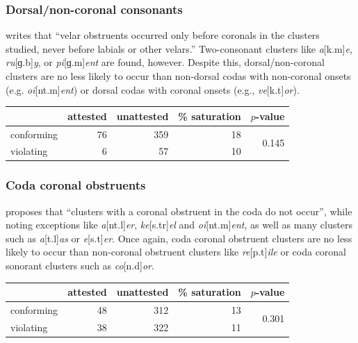 \subsubsection{Dorsal/non-coronal consonants}

\citet[173]{Pierrehumbert1994} writes that ``velar obstruents occurred only before coronals in the clusters studied, never before labials or other velars.'' Two-consonant clusters like \emph{a}[k.m]\emph{e}, \emph{ru}[ɡ.b]\emph{y}, or \emph{pi}[ɡ.m]\emph{ent} are found, however. Despite this, dorsal/non-coronal clusters are no less likely to occur than non-dorsal codas with non-coronal onsets (e.g. \emph{oi}[nt.m]\emph{ent}) or dorsal codas with coronal onsets (e.g., \emph{ve}[k.t]\emph{or}).

\begin{example}
\begin{tabular}{l r r r r}
\toprule
           & attested & unattested & \% saturation & $p$-value \\
\midrule
conforming & 76 & 359 & 18 & \multirow{2}{*}{0.145} \\
violating  &  6 &  57 & 10 \\
\bottomrule
\end{tabular}
\end{example}

\subsubsection{Coda coronal obstruents}

\citet[175]{Pierrehumbert1994} proposes that ``clusters with a coronal obstruent in the coda do not occur'', while noting exceptions like \emph{a}[nt.l]\emph{er}, \emph{ke}[s.tr]\emph{el} and \emph{oi}[nt.m]\emph{ent}, as well as many clusters such as \emph{a}[t.l]\emph{as} or \emph{e}[s.t]\emph{er}. Once again, coda coronal obstruent clusters are no less likely to occur than non-coronal obstruent clusters like \emph{re}[p.t]\emph{ile} or coda coronal sonorant clusters such as \emph{co}[n.d]\emph{or}.

\begin{example}
\begin{tabular}{l r r r r}
\toprule
           & attested & unattested & \% saturation & $p$-value \\
\midrule
conforming & 48       & 312        & 13            & \multirow{2}{*}{0.301} \\
violating  & 38       & 322        & 11            \\
\bottomrule
\end{tabular}
\end{example}

